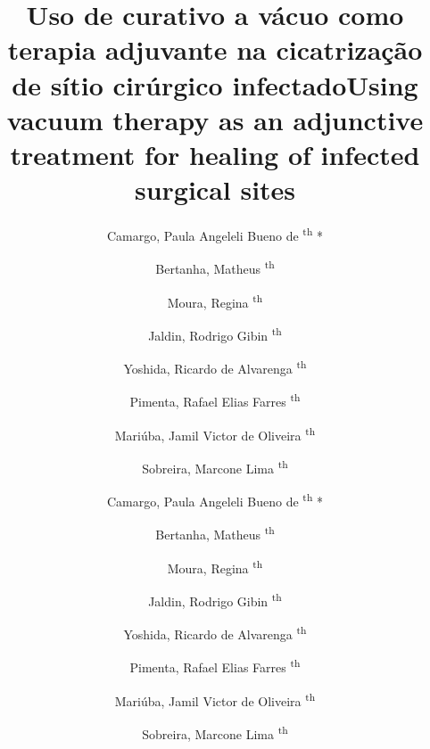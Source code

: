 \documentclass[numberinsection,times,10pt,spreadimages]{memoir}
\begin{document}
\title{Uso de curativo a vácuo como terapia adjuvante na cicatrização de
sítio cirúrgico infectado}
\author[\textsuperscript{th}
*]{Camargo, Paula Angeleli Bueno de
\textsuperscript{th}
*}
\author[\textsuperscript{th}
]{Bertanha, Matheus
\textsuperscript{th}
}
\author[\textsuperscript{th}
]{Moura, Regina
\textsuperscript{th}
}
\author[\textsuperscript{th}
]{Jaldin, Rodrigo Gibin
\textsuperscript{th}
}
\author[\textsuperscript{th}
]{Yoshida, Ricardo de Alvarenga
\textsuperscript{th}
}
\author[\textsuperscript{th}
]{Pimenta, Rafael Elias Farres
\textsuperscript{th}
}
\author[\textsuperscript{th}
]{Mariúba, Jamil Victor de Oliveira
\textsuperscript{th}
}
\author[\textsuperscript{th}
]{Sobreira, Marcone Lima
\textsuperscript{th}
}\title{Using vacuum therapy as an
adjunctive treatment for healing of
infected surgical sites}
\author[\textsuperscript{th}
*]{Camargo, Paula Angeleli Bueno de
\textsuperscript{th}
*}
\author[\textsuperscript{th}
]{Bertanha, Matheus
\textsuperscript{th}
}
\author[\textsuperscript{th}
]{Moura, Regina
\textsuperscript{th}
}
\author[\textsuperscript{th}
]{Jaldin, Rodrigo Gibin
\textsuperscript{th}
}
\author[\textsuperscript{th}
]{Yoshida, Ricardo de Alvarenga
\textsuperscript{th}
}
\author[\textsuperscript{th}
]{Pimenta, Rafael Elias Farres
\textsuperscript{th}
}
\author[\textsuperscript{th}
]{Mariúba, Jamil Victor de Oliveira
\textsuperscript{th}
}
\author[\textsuperscript{th}
]{Sobreira, Marcone Lima
\textsuperscript{th}
}

\maketitle

\setcounter{footnote}{4}
\end{document}
